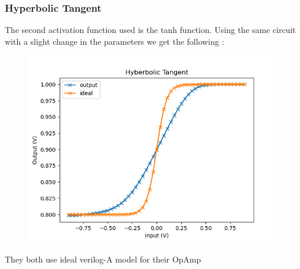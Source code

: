 \documentclass{beamer}
\begin{document}
\begin{frame}
\frametitle{Hyperbolic Tangent}
The second activation function used is the tanh function. Using the same circuit with a slight change in the parameters we get the following :
\begin{figure}    
    \centering
    \includegraphics[height=0.5\textheight]{figures/tanh.png}
\end{figure}
They both use ideal verilog-A model for their OpAmp
\end{frame}
\end{document}
